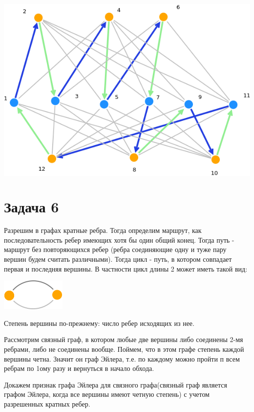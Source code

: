 \documentclass{article}
\begin{document}
\includegraphics[scale=0.7]{5_2}

\section{Задача 6}

Разрешим в графах кратные ребра. Тогда определим маршрут, как последовательность ребер имеющих хотя бы один общий конец. Тогда путь - маршрут без повторяющихся ребер (ребра соединяющие одну и туже пару вершин будем считать различными). Тогда цикл - путь, в котором совпадает первая и последняя вершины. В частности цикл длины 2 может иметь такой вид:
\\
\begin{center}
	\includegraphics[scale=0.6]{6_1}
\end{center}

Степень вершины по-прежнему: число ребер исходящих из нее.

Рассмотрим связный граф, в котором любые две вершины либо соединены 2-мя ребрами, либо не соединены вообще. Поймем, что в этом графе степень каждой вершины четна. Значит он граф Эйлера, т.е. по каждому можно пройти п всем ребрам по 1ому разу и вернуться в начало обхода.

Докажем признак графа Эйлера для связного графа(связный граф является графом Эйлера, когда все вершины имеют четную степень) с учетом разрешенных кратных ребер.
\end{document}
